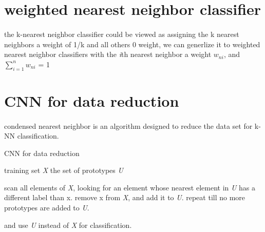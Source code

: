 \documentclass{article}
\begin{document}
\section{weighted nearest neighbor classifier}
  \paragraph{}
    the k-nearest neighbor classifier could be viewed as assigning the k nearest neighbors a weight of 1/k and all others 0 weight, we can generlize it to weighted nearest neighbor classifiers with the \textit{i}th nearest neighbor a weight $\textit{w}_{ni}$, and $\sum_{i = 1}^{n} \textit{w}_{ni}$ = 1

\section{CNN for data reduction}
  \paragraph{}
    condensed nearest neighbor is an algorithm designed to reduce the data set for k-NN classification.
    \begin{algorithm}
      \caption{CNN for data reduction}
      \hspace*{0.02in}{\bf Input:} training set \textit{X}
      \newline{}
      \hspace*{0.02in}{\bf Output:} the set of prototypes \textit{U}
      \begin{algorithmic}[1]
        \State scan all elements of \textit{X}, looking for an element whose nearest element in \textit{U} has a different label than x.
        \State remove x from \textit{X}, and add it to \textit{U}.
        \State repeat till no more prototypes are added to \textit{U}.
      \end{algorithmic}
    \end{algorithm}
    \newline{}
    and use \textit{U} instead of \textit{X} for classification.
\end{document}
